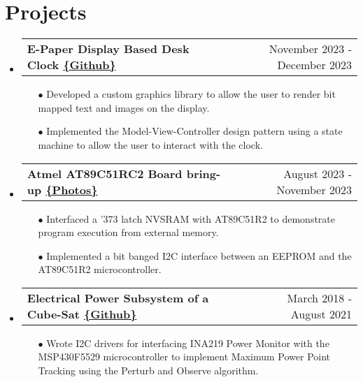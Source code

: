 \documentclass[a4,11pt]{article}
\makeatletter
\newcommand{\resumeSubheadingP}[2]{
  \vspace{-2pt}\item
    \begin{tabular*}{1.0\textwidth}[t]{l@{\extracolsep{\fill}}r}
       \textbf{{\large #1}} &  {#2} \\
    \end{tabular*}\vspace{-1pt}
}
\newcommand{\resumeSubHeadingListStart}{\begin{itemize}[leftmargin=0.0in, label={}]}
\newcommand{\resumeSubHeadingListEnd}{\end{itemize}}
\makeatother
\begin{document}
\section{Projects}
  \resumeSubHeadingListStart
    \resumeSubheadingP
    {E-Paper Display Based Desk Clock \href{https://github.com/parthkharade/Eink-DeskClock}{\small{\{Github\}}}}{November 2023 - December 2023}
    \begin{itemize}\setlength{\itemsep}{0pt}\setlength{\parskip}{0pt}\vspace{-0.2cm}
            \item[$\bullet$] Developed a custom graphics library to allow the user to render bit mapped text and images on the display.
            \item[$\bullet$] Implemented the Model-View-Controller design pattern using a state machine to allow the user to interact with the clock.
        \end{itemize}
    \resumeSubheadingP
    {Atmel AT89C51RC2 Board bring-up \href{https://drive.google.com/drive/folders/1rbtfpOdMc_ohnfu15VS3bPxNDx-BoWwA?usp=drive_link}{\small{\{Photos\}}}}{August 2023 - November 2023}
    \begin{itemize}\setlength{\itemsep}{0pt}\setlength{\parskip}{0pt}\vspace{-0.2cm}
            \item[$\bullet$] Interfaced a '373 latch NVSRAM with AT89C51R2 to demonstrate program execution from external memory.
            \item[$\bullet$] Implemented a bit banged I2C interface between an EEPROM and the AT89C51R2 microcontroller.
        \end{itemize}
    \resumeSubheadingP
    {Electrical Power Subsystem of a Cube-Sat \href{https://github.com/parthkharade/MSP430F5529}{\small{\{Github\}}}}{March 2018 - August 2021}
    \begin{itemize}\setlength{\itemsep}{0pt}\setlength{\parskip}{0pt}\vspace{-0.2cm}
            \item[$\bullet$] Wrote I2C drivers for interfacing INA219 Power Monitor with the MSP430F5529 microcontroller to implement Maximum Power Point Tracking using the Perturb and Observe algorithm.
        \end{itemize}
    \resumeSubHeadingListEnd
\vspace{-16pt}
\end{document}
